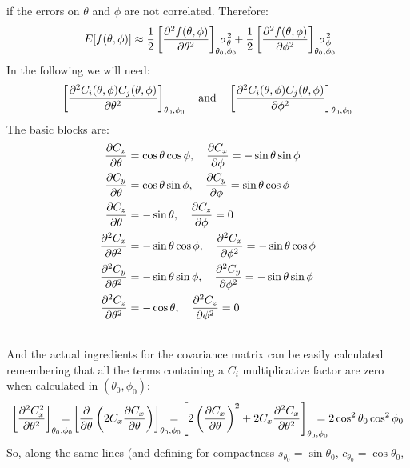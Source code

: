 \documentclass[a4paper,11pt]{article}
\newcommand{\pder}[2]{\frac{\partial#1}{\partial#2}}
\newcommand{\pdersec}[3]%
           {\ifthenelse{\equal{#2}{#3}}%
             {\frac{\partial^2#1}{\partial#2^2}}%
             {\frac{\partial^2#1}{\partial#2\partial#3}}%
           }
\begin{document}
if the errors on $\theta$ and $\phi$ are not correlated. Therefore:
\begin{align}
  E[f(\theta, \phi)] \approx
  \frac{1}{2}\left[\pdersec{f(\theta, \phi)}{\theta}{\theta}
  \right]_{\theta_0, \phi_0}
  \!\!\!\!\!\!\!\!\!\!\sigma^2_\theta + 
  \frac{1}{2}\left[\pdersec{f(\theta, \phi)}{\phi}{\phi}
    \right]_{\theta_0, \phi_0}
  \!\!\!\!\!\!\!\!\!\!\sigma^2_\phi
\end{align}
In the following we will need:
\begin{align}
  \nonumber
  \left[\pdersec{C_i(\theta, \phi)C_j(\theta, \phi)}{\theta}{\theta}
    \right]_{\theta_0, \phi_0}
  \quad {\rm and}\quad
  \left[\pdersec{C_i(\theta, \phi)C_j(\theta, \phi)}{\phi}{\phi}
    \right]_{\theta_0, \phi_0}
\end{align}
The basic blocks are:
\begin{align}
  \nonumber
  \pder{C_x}{\theta} &= \cos\theta\cos\phi ,\quad 
  \pder{C_x}{\phi} = -\sin\theta\sin\phi\\\nonumber
  \pder{C_y}{\theta} &= \cos\theta\sin\phi ,\quad
  \pder{C_y}{\phi} = \sin\theta\cos\phi\\\nonumber
  \pder{C_z}{\theta} &= -\sin\theta ,\quad
  \pder{C_z}{\phi} = 0\\\nonumber
  \pdersec{C_x}{\theta}{\theta} &= -\sin\theta\cos\phi ,\quad 
  \pdersec{C_x}{\phi}{\phi} = -\sin\theta\cos\phi\\\nonumber
  \pdersec{C_y}{\theta}{\theta} &= -\sin\theta\sin\phi ,\quad
  \pdersec{C_y}{\phi}{\phi} = -\sin\theta\sin\phi\\\nonumber
  \pdersec{C_z}{\theta}{\theta} &= -\cos\theta ,\quad
  \pdersec{C_z}{\phi}{\phi} = 0\\\nonumber
\end{align}
And the actual ingredients for the covariance matrix can be easily
calculated remembering that all the terms containing a $C_i$ multiplicative
factor are zero when calculated in $(\theta_0, \phi_0)$:
\begin{align}
  \left[\pdersec{C^2_x}{\theta}{\theta}\right]_{\theta_0, \phi_0}
  \!\!\!\!\!\!\!\! =
  \left[\pder{}{\theta}\left(2C_x\pder{C_x}{\theta}\right)
    \right]_{\theta_0, \phi_0}
  \!\!\!\!\!\!\!\! =
  \left[2\left(\pder{C_x}{\theta}\right)^2 +
    2C_x\pdersec{C_x}{\theta}{\theta}\right]_{\theta_0, \phi_0}
  \!\!\!\!\!\!\!\! = 2\cos^2\theta_0\cos^2\phi_0
\end{align}
So, along the same lines (and defining for compactness
$s_{\theta_0} = \sin\theta_0$, $c_{\theta_0} = \cos\theta_0$,
\end{document}
